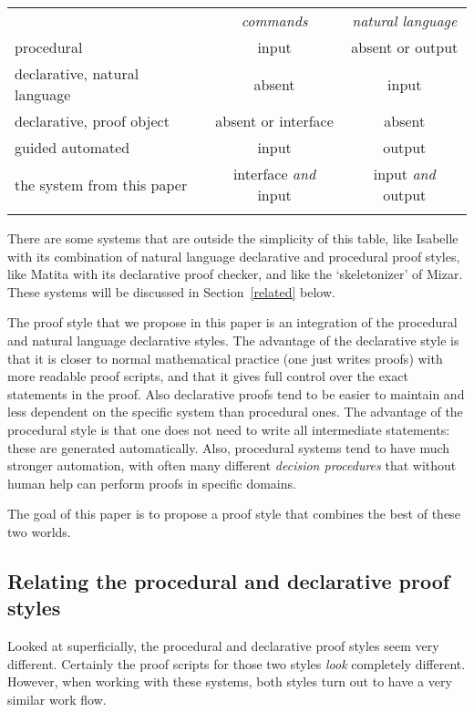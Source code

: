 \documentclass{LMCS}
\let\xmedskip=\medskip
\begin{document}
\xmedskip
\begin{center}
\begin{tabular}{lcc}
& \emph{commands} & \emph{natural language} \\
\noalign{\smallskip}
\hline
\noalign{\smallskip}
procedural & input & absent or output \\
declarative, natural language & absent & input \\
declarative, proof object & absent or interface & absent \\
guided automated & input & output \\
\noalign{\smallskip}
\hline
\noalign{\smallskip}
{the system from this paper}
& interface \emph{and} input & input \emph{and} output \\
\noalign{\smallskip}
\hline
\end{tabular}
\end{center}
\xmedskip

\noindent
There are some systems that are
outside the simplicity of this
table, like Isabelle with its combination of natural language declarative
and procedural proof styles,
like Matita
with its declarative
proof checker, and like the `skeletonizer' of Mizar.
These systems will be discussed in Section~\ref{related} below.

The proof style that we propose in this paper 
is an integration of the procedural and natural language declarative
styles.
The advantage of the declarative style is that it is
closer to normal mathematical practice (one just writes proofs)
with more readable proof scripts,
and that it gives full control over the exact statements in the
proof.
Also declarative proofs tend to be easier to maintain
and less dependent on the specific system
than procedural ones.
The advantage of the procedural style is 
that one does not need to write all intermediate statements: these are generated automatically.
Also, procedural systems tend to have much stronger automation,
with often many different \emph{decision procedures}
that without human help can perform proofs in specific domains.

The goal of this paper is to propose a proof style that
combines the best of these two worlds.

\subsection{Relating the procedural and declarative proof styles}

\noindent
Looked at superficially, the procedural and declarative
proof styles seem very different.
Certainly the proof scripts for those two styles \emph{look} completely
different.
However, when working with these systems, both styles turn out
to have a very similar work flow.
\end{document}
